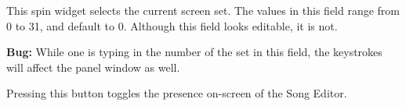    This spin widget selects the current screen set.  The values in this
   field range from 0 to 31, and default to 0.
   Although this field looks editable, it is not.

   \textbf{Bug:}
   While one is typing in the number of the set in this field, the keystrokes
   will affect the panel window as well.

   Pressing this button toggles the presence on-screen of the Song
   Editor.

